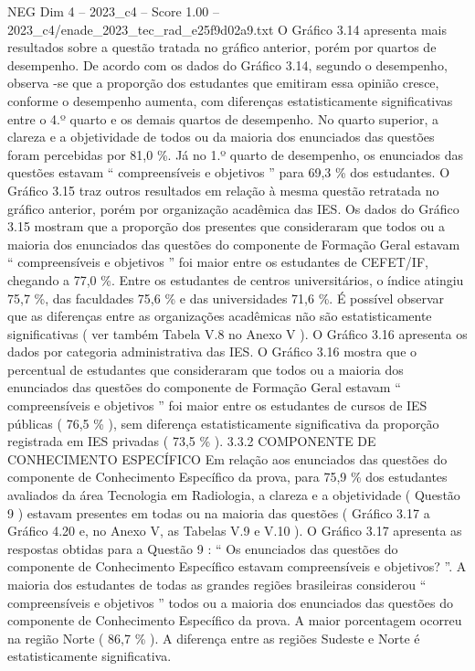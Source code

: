 \begin{textsample}{NEG Dim 4 – 2023\_c4 – Score 1.00 – 2023\_c4/enade\_2023\_tec\_rad\_e25f9d02a9.txt}
O Gráfico 3.14 apresenta mais resultados sobre a questão tratada no gráfico anterior, porém por quartos de desempenho.
De acordo com os dados do Gráfico 3.14, segundo o desempenho, observa -se que a proporção dos estudantes que emitiram essa opinião cresce, conforme o desempenho aumenta, com diferenças estatisticamente significativas entre o 4.º quarto e os demais quartos de desempenho.
No quarto superior, a clareza e a objetividade de todos ou da maioria dos enunciados das questões foram percebidas por 81,0 \%.
Já no 1.º quarto de desempenho, os enunciados das questões estavam “ compreensíveis e objetivos ” para 69,3 \% dos estudantes.
O Gráfico 3.15 traz outros resultados em relação à mesma questão retratada no gráfico anterior, porém por organização acadêmica das IES.
Os dados do Gráfico 3.15 mostram que a proporção dos presentes que consideraram que todos ou a maioria dos enunciados das questões do componente de Formação Geral estavam “ compreensíveis e objetivos ” foi maior entre os estudantes de CEFET/IF, chegando a 77,0 \%.
Entre os estudantes de centros universitários, o índice atingiu 75,7 \%, das faculdades 75,6 \% e das universidades 71,6 \%.
É possível observar que as diferenças entre as organizações acadêmicas não são estatisticamente significativas ( ver também Tabela V.8 no Anexo V ).
O Gráfico 3.16 apresenta os dados por categoria administrativa das IES.
O Gráfico 3.16 mostra que o percentual de estudantes que consideraram que todos ou a maioria dos enunciados das questões do componente de Formação Geral estavam “ compreensíveis e objetivos ” foi maior entre os estudantes de cursos de IES públicas ( 76,5 \% ), sem diferença estatisticamente significativa da proporção registrada em IES privadas ( 73,5 \% ). 3.3.2 COMPONENTE DE CONHECIMENTO ESPECÍFICO Em relação aos enunciados das questões do componente de Conhecimento Específico da prova, para 75,9 \% dos estudantes avaliados da área Tecnologia em Radiologia, a clareza e a objetividade ( Questão 9 ) estavam presentes em todas ou na maioria das questões ( Gráfico 3.17 a Gráfico 4.20 e, no Anexo V, as Tabelas V.9 e V.10 ).
O Gráfico 3.17 apresenta as respostas obtidas para a Questão 9 : “ Os enunciados das questões do componente de Conhecimento Específico estavam compreensíveis e objetivos? ”.
A maioria dos estudantes de todas as grandes regiões brasileiras considerou “ compreensíveis e objetivos ” todos ou a maioria dos enunciados das questões do componente de Conhecimento Específico da prova.
A maior porcentagem ocorreu na região Norte ( 86,7 \% ).
A diferença entre as regiões Sudeste e Norte é estatisticamente significativa.

\end{textsample}
